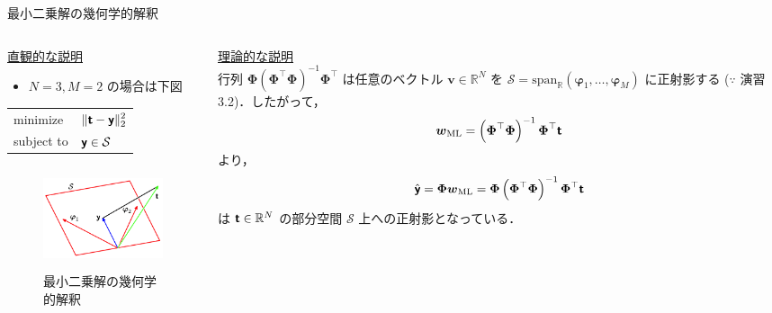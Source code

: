 \documentclass[uplatex,11pt,dvipdfmx,aspectratio=169,unicode,t]{beamer}
\numberwithin{equation}{section}
\newcommand{\BR}{\mathbb{R}}
\newcommand{\CS}{\mathcal{S}}
\newcommand{\tb}[1]{\textbf{#1}}
\newcommand{\ts}[1]{\textsf{#1}}
\newcommand{\bs}[1]{\boldsymbol{#1}}
\newcommand{\1}{\bs{1}}
\newcommand{\0}{\bs{0}}
\newcommand{\norm}[1]{\|#1\|}
\begin{document}
\begin{frame}{最小二乗解の幾何学的解釈}
    \begin{columns}
        \begin{column}{0.5\textwidth}
        \underline{直観的な説明}
            \begin{itemize}
                \item $N=3,M=2$ の場合は下図
            \end{itemize}
            \begin{table}[h]
                \centering
                \begin{tabular}{ll}
                    minimize & $\displaystyle\norm{\tb{\ts{t}} - \tb{\ts{y}}}_{2}^{2}$ \\
                    subject to & $\tb{\ts{y}} \in \CS$
                \end{tabular}
            \end{table}
            \begin{figure}
                \centering
                \includegraphics[height=3cm]{prml_fig_3-2.png}
                \caption{最小二乗解の幾何学的解釈}
                \label{fig:3.2}
            \end{figure}
        \end{column}
        \begin{column}{0.5\textwidth}
            \underline{理論的な説明}\\
            \vspace{2.5pt}
            行列 $\bs{\Phi} \left(\bs{\Phi}^{\top} \bs{\Phi}\right)^{-1} \bs{\Phi}^{\top}$ は任意のベクトル $\bs{v} \in \BR^{N}$ を $\CS = \text{span}_{\BR}(\bs{\varphi}_{1},\ldots,\bs{\varphi}_{M})$ に正射影する ($\because$ 演習 3.2)．したがって，
            \begin{equation}
                \bs{w}_{\text{ML}} = \left(\bs{\Phi}^{\top} \bs{\Phi}\right)^{-1} \bs{\Phi}^{\top} \tb{\ts{t}}
            \end{equation}
            より，
            \begin{equation} \label{eq:projection}
                \hat{\tb{\ts{y}}} = \bs{\Phi} \bs{w}_{\text{ML}} = \bs{\Phi} \left(\bs{\Phi}^{\top} \bs{\Phi}\right)^{-1} \bs{\Phi}^{\top} \tb{\ts{t}}
            \end{equation}
            は $\tb{\ts{t}} \in \BR^{N}$ の部分空間 $\CS$ 上への正射影となっている．
        \end{column}
    \end{columns}
\end{frame}
\end{document}
